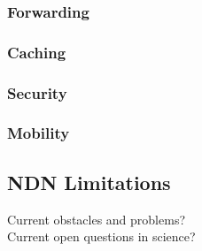 \subsubsection{Forwarding}

\subsubsection{Caching}

\subsubsection{Security}

\subsubsection{Mobility}

\subsection{NDN Limitations}
Current obstacles and problems? \\
Current open questions in science?

